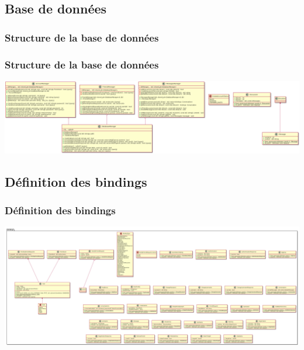 \documentclass{beamer}
\begin{document}
\subsection{Base de données}

\subsubsection{Structure de la base de données}
\begin{frame}
\frametitle{Structure de la base de données}

\includegraphics[width=1\textwidth]{../../res/uml/class/DatabaseClass.png}
\end{frame}

\subsection{Définition des bindings}
\begin{frame}
\frametitle{Définition des bindings}

\includegraphics[width=1\textwidth]{../../res/uml/class/BindingClass.png}
\end{frame}
\end{document}
